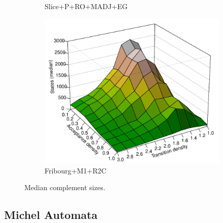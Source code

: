 \begin{figure}[ht]
\begin{subfigure}[t]{\perspwidth\textwidth}
  \caption{Slice+P+RO+MADJ+EG}
  \end{subfigure}
  \hfill
  \begin{subfigure}[t]{\perspwidth\textwidth}
  \centering
  \includegraphics[width=\textwidth]{figures/r/external/goal/s.median.Fribourg+M1+R2C.pdf}
  \caption{Fribourg+M1+R2C}
  \end{subfigure}
  \hfill
\caption{Median complement sizes.}
\end{figure}



\subsection{Michel Automata}




